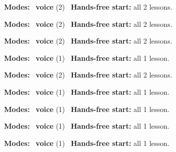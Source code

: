 \expandafter\def\csname hlchaptermodality6\endcsname{%
  {\small\noindent
    \textbf{Modes:} \hlvoicesign{}~\textbf{voice} (2)\quad
    \hlvoicesign{}~\textbf{Hands-free start:} all 2 lessons.%
    \par}\medskip
}

\expandafter\def\csname hlchaptermodality7\endcsname{%
  {\small\noindent
    \textbf{Modes:} \hlvoicesign{}~\textbf{voice} (2)\quad
    \hlvoicesign{}~\textbf{Hands-free start:} all 2 lessons.%
    \par}\medskip
}

\expandafter\def\csname hlchaptermodality8\endcsname{%
  {\small\noindent
    \textbf{Modes:} \hlvoicesign{}~\textbf{voice} (2)\quad
    \hlvoicesign{}~\textbf{Hands-free start:} all 2 lessons.%
    \par}\medskip
}

\expandafter\def\csname hlchaptermodality9\endcsname{%
  {\small\noindent
    \textbf{Modes:} \hlvoicesign{}~\textbf{voice} (1)\quad
    \hlvoicesign{}~\textbf{Hands-free start:} all 1 lesson.%
    \par}\medskip
}

\expandafter\def\csname hlchaptermodality10\endcsname{%
  {\small\noindent
    \textbf{Modes:} \hlvoicesign{}~\textbf{voice} (2)\quad
    \hlvoicesign{}~\textbf{Hands-free start:} all 2 lessons.%
    \par}\medskip
}

\expandafter\def\csname hlchaptermodality11\endcsname{%
  {\small\noindent
    \textbf{Modes:} \hlvoicesign{}~\textbf{voice} (1)\quad
    \hlvoicesign{}~\textbf{Hands-free start:} all 1 lesson.%
    \par}\medskip
}

\expandafter\def\csname hlchaptermodality12\endcsname{%
  {\small\noindent
    \textbf{Modes:} \hlvoicesign{}~\textbf{voice} (1)\quad
    \hlvoicesign{}~\textbf{Hands-free start:} all 1 lesson.%
    \par}\medskip
}

\expandafter\def\csname hlchaptermodality13\endcsname{%
  {\small\noindent
    \textbf{Modes:} \hlvoicesign{}~\textbf{voice} (1)\quad
    \hlvoicesign{}~\textbf{Hands-free start:} all 1 lesson.%
    \par}\medskip
}

\expandafter\def\csname hlchaptermodality14\endcsname{%
  {\small\noindent
    \textbf{Modes:} \hlvoicesign{}~\textbf{voice} (1)\quad
    \hlvoicesign{}~\textbf{Hands-free start:} all 1 lesson.%
    \par}\medskip
}

